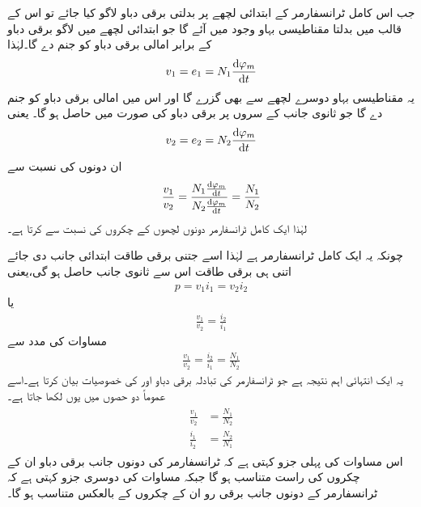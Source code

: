 جب اس کامل ٹرانسفارمر کے ابتدائی لچھے پر بدلتی برقی دباو  لاگو کیا جائے تو اس کے قالب میں بدلتا مقناطیسی بہاو   وجود میں  آئے گا جو ابتدائی لچھے میں   لاگو برقی دباو  کے برابر امالی برقی دباو  کو جنم دے گا۔لہٰذا
\begin{align}
v_1=e_1=N_1 \frac{\dif \varphi_m}{\dif t}
\end{align}
یہ مقناطیسی بہاو دوسرے لچھے سے بھی گزرے گا اور اس میں  امالی برقی دباو کو جنم دے گا جو ثانوی جانب کے سروں پر برقی دباو   کی صورت میں حاصل ہو گا۔ یعنی
\begin{align}
v_2=e_2=N_2 \frac{\dif \varphi_m}{\dif t}
\end{align}
ان دونوں کی نسبت سے
\begin{align}\label{مساوات_ٹرانسفارمر_تبادلہ_دباو}
\frac{v_1}{v_2}=\frac{N_1 \frac{\dif \varphi_m}{\dif t}}{N_2 \frac{\dif \varphi_m}{\dif t}}=\frac{N_1}{N_2}
\end{align}
لہٰذا ایک کامل ٹرانسفارمر دونوں لچھوں کے چکروں کی نسبت سے  کرتا ہے۔

چونکہ یہ ایک کامل ٹرانسفارمر ہے لہٰذا اسے جتنی برقی طاقت ابتدائی جانب  دی جائے اتنی ہی برقی طاقت اس سے ثانوی جانب حاصل ہو گی،یعنی
\begin{align}
p=v_1 i_1 = v_2 i_2
\end{align}
یا
\begin{align}
\frac{v_1}{v_2}=\frac{i_2}{i_1}
\end{align}
مساوات   کی مدد سے
\begin{align}
\frac{v_1}{v_2}=\frac{i_2}{i_1}=\frac{N_1}{N_2}
\end{align}
یہ ایک انتہائی اہم نتیجہ ہے جو ٹرانسفارمر کی تبادلہ برقی دباو اور   کی خصوصیات بیان کرتا ہے۔اسے عموماً دو حصوں میں یوں لکھا جاتا ہے۔
\begin{gather}
\begin{aligned}\label{مساوات_ٹرانسفارمر_تبادلہ_دباو_رو}
\frac{v_1}{v_2}&=\frac{N_1}{N_2}\\
\frac{i_1}{i_2}&=\frac{N_2}{N_1}
\end{aligned}
\end{gather}
اس مساوات کی پہلی جزو کہتی ہے کہ ٹرانسفارمر کی دونوں جانب برقی دباو  ان کے چکروں کی راست متناسب  ہو گا جبکہ مساوات کی دوسری جزو کہتی ہے کہ ٹرانسفارمر کے دونوں جانب برقی رو ان کے چکروں کے بالعکس متناسب ہو گا۔

